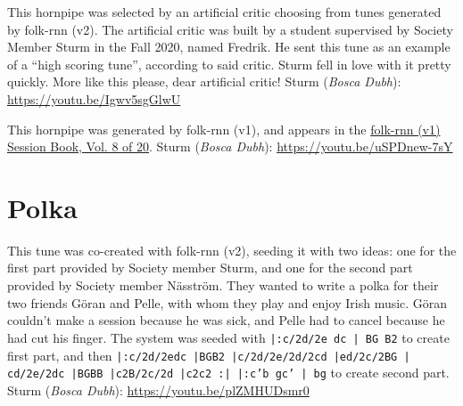 \documentclass[a4paper,notitlepage,twoside]{book}
\begin{document}
{}\label{hornpipe:FredriksChristmasCritic}
\hypertarget{hornpipe:FredriksChristmasCritic}{}
This hornpipe was selected by an artificial critic choosing from tunes generated by folk-rnn (v2). The artificial critic was built by a student supervised by Society Member Sturm in the Fall 2020, named Fredrik. He sent  this tune as an example of a ``high scoring tune'', according to said critic. Sturm fell in love with it pretty quickly. More like this please, dear artificial critic! Sturm ({\em Bosca Dubh}): \url{https://youtu.be/Igwv5sgGlwU}

{}  
  
\hypertarget{hornpipe:SorpikesCat}{}
This hornpipe was generated by folk-rnn (v1), and
appears in the \href{https://highnoongmt.wordpress.com/2018/01/05/volumes-1-20-of-folk-rnn-v1-transcriptions}{folk-rnn (v1) Session Book, Vol. 8 of 20}.
Sturm ({\em Bosca Dubh}): \url{https://youtu.be/uSPDnew-7sY}

\clearpage
\section{Polka}
{}  
 
\hypertarget{polka:GoranPelle}{}
This tune was co-created with folk-rnn (v2), seeding it with two ideas: 
one for the first part provided by Society member Sturm, 
and one for the second part provided by Society member Näsström. 
They wanted to write a polka for their two friends Göran and Pelle, 
with whom they play and enjoy Irish music. 
Göran couldn't make a session because he was sick, 
and Pelle had to cancel because he had cut his finger.
The system was seeded with {\tt |:c/2d/2e dc | BG B2} to create first part,
and then 
{\tt |:c/2d/2edc |BGB2 |c/2d/2e/2d/2cd |ed/2c/2BG | cd/2e/2dc |BGBB |c2B/2c/2d |c2c2 :| |:c'b gc' | bg}
to create second part.
Sturm ({\em Bosca Dubh}): \url{https://youtu.be/plZMHUDsmr0}
\end{document}
